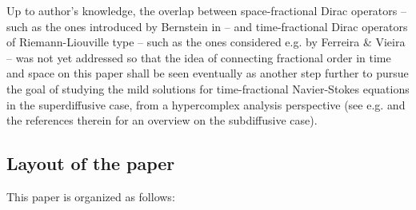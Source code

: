 \documentclass{elsarticle}
\begin{document}
Up to author's knowledge, the overlap between space-fractional Dirac operators -- such as the ones introduced by Bernstein in \cite{B16} -- and time-fractional Dirac operators of Riemann-Liouville type -- such as the ones considered e.g. by Ferreira \& Vieira \cite{FV16} --  was not yet addressed so that the idea of connecting fractional order in time and space on this paper shall be seen eventually as another step further to pursue the goal of studying the mild solutions for time-fractional Navier-Stokes equations in the superdiffusive case, from a hypercomplex analysis perspective (see e.g. \cite{CarvalhoPlanas15,ZP17} and the references therein for an overview on the subdiffusive case).




\subsection{Layout of the paper}
This paper is organized as follows:
\end{document}
